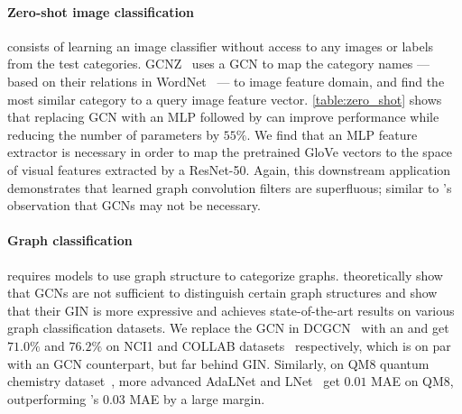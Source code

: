 \paragraph{Zero-shot image classification} consists of learning an image classifier without access to any images or labels from the test categories. 
GCNZ~\citep{wang2018zero} uses a GCN to map the category names --- based on their relations in WordNet~\citep{miller1995wordnet} --- to image feature domain, and find the most similar category to a query image feature vector.
\autoref{table:zero_shot} shows that replacing GCN with an MLP followed by \method{} can improve performance while reducing the number of parameters by $55\%$.
We find that an MLP feature extractor is necessary in order to map the pretrained GloVe vectors to the space of visual features extracted by a ResNet-50.
Again, this downstream application demonstrates that learned graph convolution filters are superfluous; similar to \citet{EXEM}'s observation that GCNs may not be necessary. 


\paragraph{Graph classification} requires models to use graph structure to categorize graphs.
\citet{xu2018how} theoretically show that GCNs are not sufficient to distinguish certain graph structures and show that their GIN is more expressive and achieves state-of-the-art results on various graph classification datasets. We replace the GCN in DCGCN~\citep{zhang2018end} with an \method{} and get $71.0\%$ and $76.2\%$ on NCI1 and COLLAB datasets~\citep{yanardag2015deep} respectively, which is on par with an GCN counterpart, but far behind GIN. Similarly, on QM8 quantum chemistry dataset~\citep{ramakrishnan2015electronic}, more advanced AdaLNet and LNet~\citep{liao2018lanczosnet} get $0.01$ MAE on QM8, outperforming \method{}'s $0.03$ MAE by a large margin.

